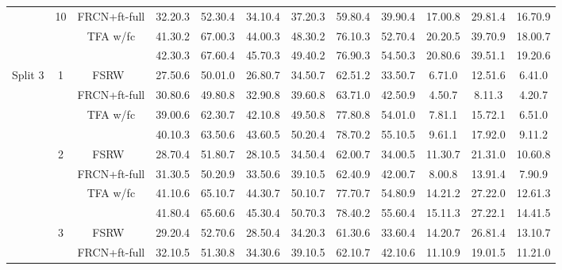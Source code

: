 \documentclass{article}
\newcommand{\model}{TFA\xspace}
\begin{document}
\begin{table*}[!h]
{\begin{tabular}{c|c|c|ccc|ccc|ccc}
    & \multirow{3}{*}{10} & FRCN+ft-full & 32.20.3 & 52.30.4 & 34.10.4 & 37.20.3 & 59.80.4 & 39.90.4 & 17.00.8 & 29.81.4 & 16.70.9 \\
    & & {\model w/fc} & 41.30.2 & 67.00.3 & 44.00.3 & 48.30.2 & 76.10.3 & 52.70.4 & 20.20.5 & 39.70.9 & 18.00.7  \\
    & & \cellcolor{Gray}{\model w/cos} & \cellcolor{Gray}42.30.3 &\cellcolor{Gray} 67.60.4 &\cellcolor{Gray} 45.70.3 &\cellcolor{Gray} 49.40.2 & \cellcolor{Gray}76.90.3 & \cellcolor{Gray}54.50.3 &\cellcolor{Gray} 20.80.6 &\cellcolor{Gray} 39.51.1 & \cellcolor{Gray}19.20.6  \\ \midrule
\multirow{21}{*}{Split 3} & \multirow{4}{*}{1} & FSRW~\cite{kang2019few} &
27.50.6&50.01.0&26.80.7&34.50.7&62.51.2&33.50.7&6.71.0&12.51.6&6.41.0 \\
    & & FRCN+ft-full & 30.80.6 & 49.80.8 & 32.90.8 & 39.60.8 & 63.71.0 & 42.50.9 & 4.50.7 & 8.11.3 & 4.20.7 \\
    & & {\model w/fc} & 39.00.6 & 62.30.7 & 42.10.8 & 49.50.8 & 77.80.8 & 54.01.0 & 7.81.1 & 15.72.1 & 6.51.0 \\
    & & \cellcolor{Gray}{\model w/cos} & \cellcolor{Gray}40.10.3 &\cellcolor{Gray} 63.50.6 &\cellcolor{Gray} 43.60.5 &\cellcolor{Gray} 50.20.4 & \cellcolor{Gray}78.70.2 & \cellcolor{Gray}55.10.5 & \cellcolor{Gray}9.61.1 & \cellcolor{Gray}17.92.0 &\cellcolor{Gray} 9.11.2  \\ \cmidrule{2-12}
    & \multirow{4}{*}{2} & FSRW~\cite{kang2019few} & 28.70.4&51.80.7&28.10.5&34.50.4&62.00.7&34.00.5&11.30.7&21.31.0&10.60.8 \\
    & & FRCN+ft-full & 31.30.5 & 50.20.9 & 33.50.6 & 39.10.5 & 62.40.9 & 42.00.7 & 8.00.8 & 13.91.4 & 7.90.9 \\
    & &{\model w/fc} & 41.10.6 & 65.10.7 & 44.30.7 & 50.10.7 & 77.70.7 & 54.80.9 & 14.21.2 & 27.22.0 & 12.61.3  \\
    & & \cellcolor{Gray}{\model w/cos} & \cellcolor{Gray}41.80.4 &\cellcolor{Gray} 65.60.6 &\cellcolor{Gray} 45.30.4 & \cellcolor{Gray}50.70.3 & \cellcolor{Gray}78.40.2 & \cellcolor{Gray}55.60.4 & \cellcolor{Gray}15.11.3 &\cellcolor{Gray} 27.22.1 & \cellcolor{Gray}14.41.5  \\ \cmidrule{2-12}
    & \multirow{4}{*}{3} & FSRW~\cite{kang2019few} & 
    29.20.4&52.70.6&28.50.4&34.20.3&61.30.6&33.60.4&14.20.7&26.81.4&13.10.7 \\
    & & FRCN+ft-full & 32.10.5 & 51.30.8 & 34.30.6 & 39.10.5 & 62.10.7 & 42.10.6 & 11.10.9 & 19.01.5 & 11.21.0 \\

\end{tabular}}
\end{table*}
\end{document}
